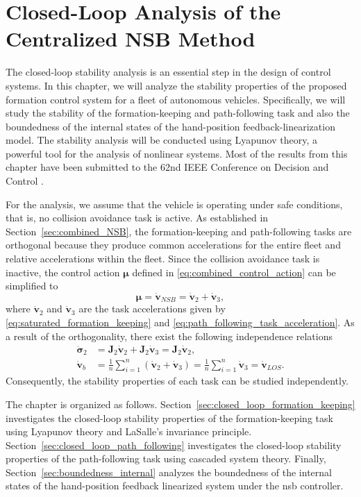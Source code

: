 \chapter{Closed-Loop Analysis of the Centralized NSB Method}\label{cha:closed_loop}
The closed-loop stability analysis is an essential step in the design of control systems. In this chapter, we will analyze the stability properties of the proposed formation control system for a fleet of autonomous vehicles. Specifically, we will study the stability of the formation-keeping and path-following task and also the boundedness of the internal states of the hand-position feedback-linearization model. The stability analysis will be conducted using Lyapunov theory, a powerful tool for the analysis of nonlinear systems. Most of the results from this chapter have been submitted to the 62nd IEEE Conference on Decision and Control \citep{lie_formation_2023}.

For the analysis, we assume that the vehicle is operating under safe conditions, that is, no collision avoidance task is active. As established in Section~\ref{sec:combined_NSB}, the formation-keeping and path-following tasks are orthogonal because they produce common accelerations for the entire fleet and relative accelerations within the fleet. Since the collision avoidance task is inactive, the control action $\bm{\mu}$ defined in \eqref{eq:combined_control_action} can be simplified to
\begin{equation}
    \bm{\mu} = \dot{\mathbf{v}}_{NSB} = \dot{\mathbf{v}}_2 + \dot{\mathbf{v}}_3,
\end{equation}
where $\dot{\mathbf{v}}_2$ and $\dot{\mathbf{v}}_3$ are the task accelerations given by \eqref{eq:saturated_formation_keeping} and \eqref{eq:path_following_task_acceleration}. As a result of the orthogonality, there exist the following independence relations
\begin{align}
    \ddot{\bm{\sigma}}_2 &= \mathbf{J}_2\dot{\mathbf{v}}_2 + \mathbf{J}_2\dot{\mathbf{v}}_3 = \mathbf{J}_2\dot{\mathbf{v}}_2,\label{eq:formation_independence}\\
    \dot{\mathbf{v}}_b &= \frac{1}{n}\sum_{i=1}^n (\dot{\mathbf{v}}_2 + \dot{\mathbf{v}}_3) = \frac{1}{n}\sum_{i=1}^n \dot{\mathbf{v}}_3 = \dot{\mathbf{v}}_{LOS}.
\end{align}
Consequently, the stability properties of each task can be studied independently.

The chapter is organized as follows. Section~\ref{sec:closed_loop_formation_keeping} investigates the closed-loop stability properties of the formation-keeping task using Lyapunov theory and LaSalle's invariance principle. Section~\ref{sec:closed_loop_path_following} investigates the closed-loop stability properties of the path-following task using cascaded system theory. Finally, Section~\ref{sec:boundedness_internal} analyzes the boundedness of the internal states of the hand-position feedback linearized system under the \gls{nsb} controller.

